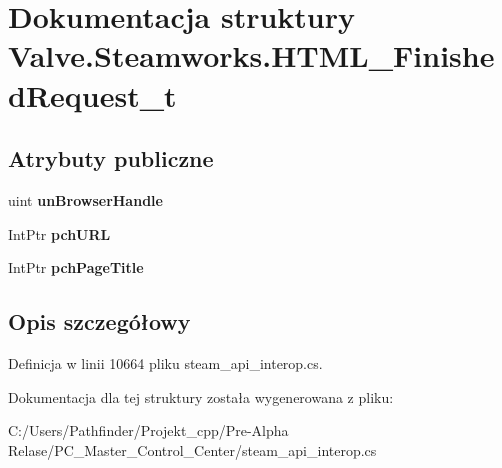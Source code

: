 \hypertarget{struct_valve_1_1_steamworks_1_1_h_t_m_l___finished_request__t}{}\section{Dokumentacja struktury Valve.\+Steamworks.\+H\+T\+M\+L\+\_\+\+Finished\+Request\+\_\+t}
\label{struct_valve_1_1_steamworks_1_1_h_t_m_l___finished_request__t}
\subsection*{Atrybuty publiczne}
\begin{DoxyCompactItemize}
\item 
\mbox{\label{struct_valve_1_1_steamworks_1_1_h_t_m_l___finished_request__t_afbf9091ada562ffa697cdd38babf660f}} 
uint {\bfseries un\+Browser\+Handle}
\item 
\mbox{\label{struct_valve_1_1_steamworks_1_1_h_t_m_l___finished_request__t_ad43cd8382f71e94f2503c6e943577556}} 
Int\+Ptr {\bfseries pch\+U\+RL}
\item 
\mbox{\label{struct_valve_1_1_steamworks_1_1_h_t_m_l___finished_request__t_a0768071687ce3d682a3ba7aef6d9e4cd}} 
Int\+Ptr {\bfseries pch\+Page\+Title}
\end{DoxyCompactItemize}


\subsection{Opis szczegółowy}


Definicja w linii 10664 pliku steam\+\_\+api\+\_\+interop.\+cs.



Dokumentacja dla tej struktury została wygenerowana z pliku\+:\begin{DoxyCompactItemize}
\item 
C\+:/\+Users/\+Pathfinder/\+Projekt\+\_\+cpp/\+Pre-\/\+Alpha Relase/\+P\+C\+\_\+\+Master\+\_\+\+Control\+\_\+\+Center/steam\+\_\+api\+\_\+interop.\+cs\end{DoxyCompactItemize}
